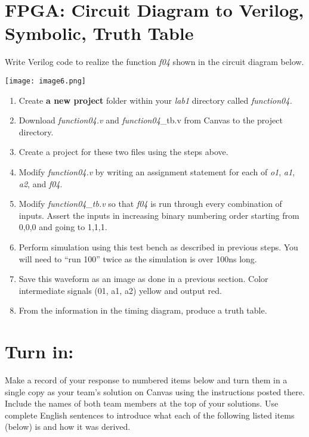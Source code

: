 \section{FPGA: Circuit Diagram to Verilog, Symbolic, Truth Table}


Write Verilog code to realize the function \emph{f04} shown in the
circuit diagram below.

\texttt{[image: image6.png]}

\begin{enumerate}
\def\labelenumi{\arabic{enumi}.}
\item
  Create \textbf{a new project} folder within your \emph{lab1} directory
  called \emph{function04.}
\item
  Download \emph{function04.v} and \emph{function04}\_tb.v from Canvas
  to the project directory.
\item
  Create a project for these two files using the steps above.
\item
  \protect\hypertarget{Part_4_Step_4}{}{}Modify \emph{function04.v} by
  writing an assignment statement for each of \emph{o1}, \emph{a1},
  \emph{a2}, and \emph{f04}.
\item
  Modify \emph{function04\_tb.v} so that \emph{f04} is run through every
  combination of inputs. Assert the inputs in increasing binary
  numbering order starting from 0,0,0 and going to 1,1,1.
\item
  Perform simulation using this test bench as described in previous
  steps. You will need to ``run 100'' twice as the simulation is over
  100ns long.
\item
  \protect\hypertarget{Part_4_Step_7}{}{}Save this waveform as an image
  as done in a previous section. Color intermediate signals (01, a1, a2)
  yellow and output red.
\item
  \protect\hypertarget{Part_4_Step_8}{}{}From the information in the
  timing diagram, produce a truth table.
\end{enumerate}


\section{Turn in:}


Make a record of your response to numbered items below and turn them in
a single copy as your team's solution on Canvas using the instructions
posted there. Include the names of both team members at the top of your
solutions. Use complete English sentences to introduce what each of the
following listed items (below) is and how it was derived.

